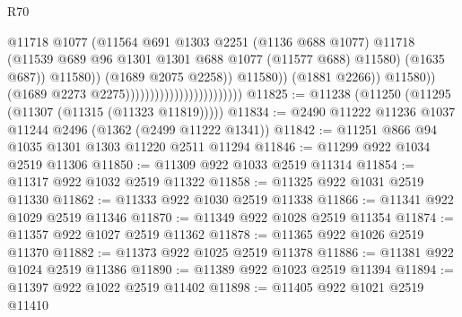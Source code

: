 \begin{lexlean}{R70}
\begin{coremodule}
                                                                  @11718
                                                                  @1077
                                                                  (@11564
                                                                    @691
                                                                    @1303
                                                                    @2251
                                                                    (@1136 @688 @1077)
                                                                    @11718
                                                                    (@11539
                                                                      @689
                                                                      @96
                                                                      @1301
                                                                      @1301
                                                                      @688
                                                                      @1077
                                                                      (@11577 @688)
                                                                      @11580)
                                                                    (@1635 @687))
                                                                  @11580))
                                                              (@1689 @2075 @2258))
                                                            @11580))
                                                        (@1881 @2266))
                                                      @11580))
                                                  (@1689 @2273 @2275))))))))))))))))))))))))
@11825 := @11238 (@11250 (@11295 (@11307 (@11315 (@11323 @11819)))))
@11834 := @2490 @11222 @11236 @1037 @11244 @2496 (@1362 (@2499 @11222 @1341))
@11842 := @11251 @866 @94 @1035 @1301 @1303 @11220 @2511 @11294
@11846 := @11299 @922 @1034 @2519 @11306
@11850 := @11309 @922 @1033 @2519 @11314
@11854 := @11317 @922 @1032 @2519 @11322
@11858 := @11325 @922 @1031 @2519 @11330
@11862 := @11333 @922 @1030 @2519 @11338
@11866 := @11341 @922 @1029 @2519 @11346
@11870 := @11349 @922 @1028 @2519 @11354
@11874 := @11357 @922 @1027 @2519 @11362
@11878 := @11365 @922 @1026 @2519 @11370
@11882 := @11373 @922 @1025 @2519 @11378
@11886 := @11381 @922 @1024 @2519 @11386
@11890 := @11389 @922 @1023 @2519 @11394
@11894 := @11397 @922 @1022 @2519 @11402
@11898 := @11405 @922 @1021 @2519 @11410

\end{coremodule}
\end{lexlean}
